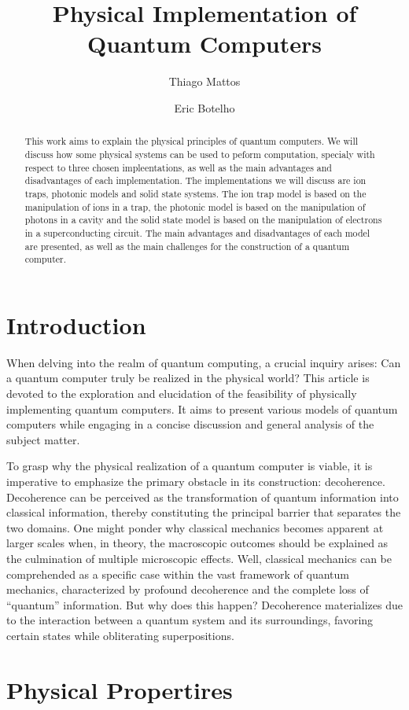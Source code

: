 \documentclass[
  journal=largetwo,
  year=2023,
]{cup-journal}
\title{Physical Implementation of Quantum Computers}
\author{Thiago Mattos}
\affiliation{Universidade Federal de Minas Gerais, Departamento de Física, Belo Horizonte, 31270-901, Minas Gerais, Brazil}
\author{Eric Botelho}
\affiliation{Universidade Federal de Minas Gerais, Departamento de Física, Belo Horizonte, 31270-901, Minas Gerais, Brazil}
\begin{document}
\begin{abstract}
  This work aims to explain the physical principles of quantum computers. We will discuss how some physical systems can be used to peform computation, specialy with respect to three chosen impleentations, as well as the main advantages and disadvantages of each implementation.
  The implementations we will discuss are ion traps, photonic models and solid state systems. The ion trap model is based on the manipulation of ions in a trap, the photonic model is based on the manipulation of photons in a cavity and the solid state model is based on the manipulation of electrons in a superconducting circuit. The main advantages and disadvantages of each model are presented, as well as the main challenges for the construction of a quantum computer.

\end{abstract}

\section{Introduction}

When delving into the realm of quantum computing, a crucial inquiry arises: Can a quantum computer truly be realized in the physical world? This article is devoted to the exploration and elucidation of the feasibility of physically implementing quantum computers. It aims to present various models of quantum computers while engaging in a concise discussion and general analysis of the subject matter.

To grasp why the physical realization of a quantum computer is viable, it is imperative to emphasize the primary obstacle in its construction: decoherence. Decoherence can be perceived as the transformation of quantum information into classical information, thereby constituting the principal barrier that separates the two domains. One might ponder why classical mechanics becomes apparent at larger scales when, in theory, the macroscopic outcomes should be explained as the culmination of multiple microscopic effects. Well, classical mechanics can be comprehended as a specific case within the vast framework of quantum mechanics, characterized by profound decoherence and the complete loss of ``quantum'' information. But why does this happen? Decoherence materializes due to the interaction between a quantum system and its surroundings, favoring certain states while obliterating superpositions.

\section{Physical Propertires}
\end{document}
